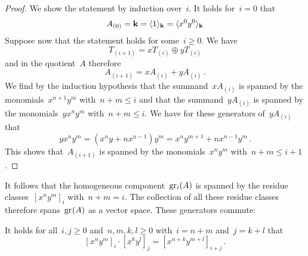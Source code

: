 \begin{example}
  \begin{proof}
    We show the statement by induction over~$i$.
    It holds for~$i = 0$ that
    \[
      A_{(0)}
      =
      \mathbf{k}
      =
      \langle1\rangle_{\mathbf{k}}
      =
      \langle x^0 y^0\rangle_{\mathbf{k}}
    \]
    Suppose now that the statement holds for some~$i \geq 0$.
    We have
    \[
      T_{(i+1)}
      =
      x T_{(i)} \oplus y T_{(i)}
    \]
    and in the quotient~$A$ therefore
    \[
      A_{(i+1)}
      =
      x A_{(i)} + y A_{(i)} \,.
    \]
    We find by the induction hypothesis that the summand~$x A_{(i)}$ is spanned by the monomials~$x^{n+1} y^m$ with~$n+m \leq i$ and that the summand~$y A_{(i)}$ is spanned by the monomials~$y x^n y^m$ with~$n + m \leq i$.
    We have for these generators of~$y A_{(i)}$ that
    \[
      y x^n y^m
      =
      (x^n y + n x^{n-1}) y^m
      =
      x^n y^{m+1} + n x^{n-1} y^m \,.
    \]
    This shows that~$A_{(i+1)}$ is spanned by the monomials~$x^n y^m$ with~$n+m \leq i+1$.
   \end{proof}
  
  It follows that the homogeneous component~$\gr[i](A)$ is spanned by the residue classes~$[x^n y^m]_i$ with~$n + m = i$.
  The collection of all these residue classes therefore spans~$\gr(A)$ as a vector space.
  These generators commute:
  
  \begin{claim}
    It holds for all~$i, j \geq 0$ and~$n, m, k, l \geq 0$ with~$i = n+m$ and~$j = k+l$ that
    \[
      [x^n y^m]_i \cdot [x^k y^l]_j
      =
      [x^{n+k} y^{m+l}]_{i+j} \,.
    \]
  \end{claim}
  

\end{example}

